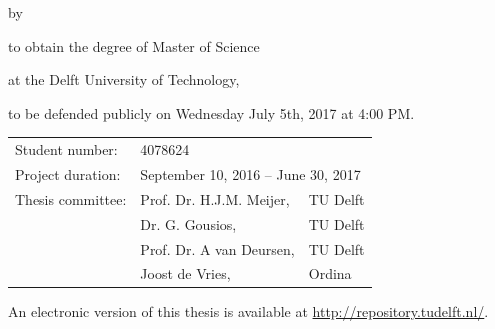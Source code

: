 \begin{titlepage}


\begin{center}

{\makeatletter

\largetitlestyle\color{tudelft-cyan}\fontsize{58}{58}
\makeatother}

{\makeatletter
\ifx\@subtitle\undefined\else
    \bigskip
   {\tudsffamily\fontsize{22}{32}\selectfont\@subtitle}    
\fi
\makeatother}

\bigskip
\bigskip

by

\bigskip
\bigskip

{\makeatletter
\largetitlestyle\fontsize{26}{26}\selectfont\@author
\makeatother}

\bigskip
\bigskip

to obtain the degree of Master of Science

at the Delft University of Technology,

to be defended publicly on Wednesday July 5th, 2017 at 4:00 PM.

\vfill

\begin{tabular}{lll}
    Student number:   & 4078624 \\
    Project duration: & \multicolumn{2}{l}{September 10, 2016 -- June 30, 2017} \\
    Thesis committee: & Prof. Dr. H.J.M. Meijer, & TU Delft \\
    				  & Dr. G. Gousios,          & TU Delft \\
    				  & Prof. Dr. A van Deursen, & TU Delft \\
    				  & Joost de Vries,          & Ordina
\end{tabular}

\bigskip
\bigskip
An electronic version of this thesis is available at \href{http://repository.tudelft.nl/}{http://repository.tudelft.nl/}.


\end{center}
\end{titlepage}
